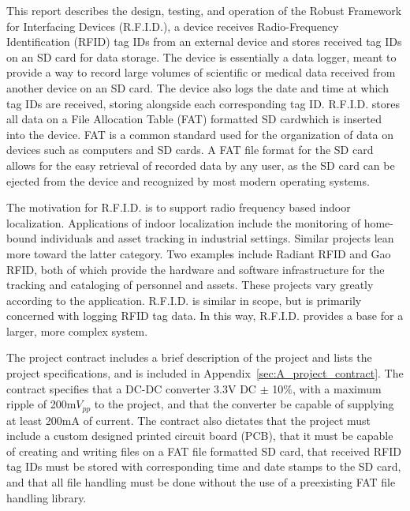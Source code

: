 This report describes the design, testing, and operation of the Robust Framework for Interfacing Devices (R.F.I.D.), a device \DIFdelbegin {}\DIFdelend \DIFaddbegin {}\DIFaddend receives Radio-Frequency Identification (RFID) tag IDs from an external device and stores \DIFaddbegin {}\DIFaddend received tag IDs on an SD card for data storage. The device is essentially a data logger, meant to provide a way to record large volumes of scientific or medical data received from another device on an SD card. The device also logs the date and time at which tag IDs are received, storing \DIFdelbegin {}\DIFdelend \DIFaddbegin {}\DIFaddend alongside each corresponding tag ID. R.F.I.D. stores all data on a File Allocation Table (FAT) formatted SD card\DIFaddbegin \DIFadd{, }\DIFaddend which is inserted into the device. FAT is a common standard used for the organization of data on devices such as computers and SD cards\DIFdelbegin {}\DIFdelend . A FAT file format for the SD card allows for the easy retrieval of recorded data by any user, as the SD card can be ejected from the device and recognized by most modern operating systems.



The motivation for R.F.I.D. is to support radio frequency based indoor localization. Applications of indoor localization include the monitoring of home-bound individuals and asset tracking in industrial settings. Similar projects lean more toward the latter category. Two examples include Radiant RFID and Gao RFID, both of which provide the hardware and software infrastructure for the tracking and cataloging of personnel and assets. These projects vary greatly according to the application. R.F.I.D. is similar in scope, but is primarily concerned with logging RFID tag data. In this way, R.F.I.D. provides a base for a larger, more complex system.

The project contract includes a brief description of the project and lists the project specifications, and is included in Appendix~\ref{sec:A_project_contract}. The contract specifies that a DC-DC converter \DIFdelbegin {}\DIFdelend \DIFaddbegin {}\DIFaddend 3.3V DC $\pm$ 10$\%$, with a maximum ripple of 200m$V_{pp}$ to the project, and that the converter be capable of supplying at least 200mA of current. The contract also dictates that the project must include a custom designed printed circuit board (PCB), that it must be capable of creating and writing files on a FAT file formatted SD card, that received RFID tag IDs must be stored with corresponding time and date stamps to the SD card, and that all file handling must be done without the use of a preexisting FAT file handling library.

